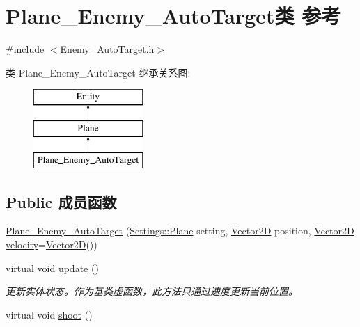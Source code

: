 \hypertarget{class_plane___enemy___auto_target}{}\section{Plane\+\_\+\+Enemy\+\_\+\+Auto\+Target类 参考}
\label{class_plane___enemy___auto_target}


{\ttfamily \#include $<$Enemy\+\_\+\+Auto\+Target.\+h$>$}

类 Plane\+\_\+\+Enemy\+\_\+\+Auto\+Target 继承关系图\+:\begin{figure}[H]
\begin{center}
\leavevmode
\includegraphics[height=3.000000cm]{class_plane___enemy___auto_target}
\end{center}
\end{figure}
\subsection*{Public 成员函数}
\begin{DoxyCompactItemize}
\item 
\hyperlink{class_plane___enemy___auto_target_abf4224e6d4c79583016c98dc8747f3ad}{Plane\+\_\+\+Enemy\+\_\+\+Auto\+Target} (\hyperlink{struct_settings_1_1_plane}{Settings\+::\+Plane} setting, \hyperlink{_vector2_d_8hpp_aa1f1145650f1dd9bddf7335ec6434d7c}{Vector2D} position, \hyperlink{_vector2_d_8hpp_aa1f1145650f1dd9bddf7335ec6434d7c}{Vector2D} \hyperlink{class_entity_a386d25b56772b8913eb3e5adc636f6e0}{velocity}=\hyperlink{_vector2_d_8hpp_aa1f1145650f1dd9bddf7335ec6434d7c}{Vector2D}())
\item 
virtual void \hyperlink{class_plane___enemy___auto_target_acae2a6f38bdc71d17188e2b7711f4d5b}{update} ()
\begin{DoxyCompactList}\small\item\em 更新实体状态。作为基类虚函数，此方法只通过速度更新当前位置。 \end{DoxyCompactList}\item 
virtual void \hyperlink{class_plane___enemy___auto_target_a002ba5754abc49b37ab3131f1a8f48c7}{shoot} ()
\end{DoxyCompactItemize}

